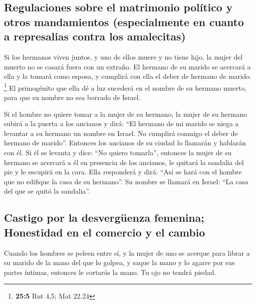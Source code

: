 \begin{paracol}{2}
\hypertarget{regulaciones-sobre-el-matrimonio-poluxedtico-y-otros-mandamientos-especialmente-en-cuanto-a-represalias-contra-los-amalecitas}{%
\subsection{Regulaciones sobre el matrimonio político y otros
mandamientos (especialmente en cuanto a represalias contra los
amalecitas)}\label{regulaciones-sobre-el-matrimonio-poluxedtico-y-otros-mandamientos-especialmente-en-cuanto-a-represalias-contra-los-amalecitas}}

 Si los hermanos viven juntos, y uno de ellos muere y no
tiene hijo, la mujer del muerto no se casará fuera con un extraño. El
hermano de su marido se acercará a ella y la tomará como esposa, y
cumplirá con ella el deber de hermano de marido. \footnote{\textbf{25:5}
  Rut 4,5; Mat 22,24}  El primogénito que ella dé a luz
sucederá en el nombre de su hermano muerto, para que su nombre no sea
borrado de Israel.

 Si el hombre no quiere tomar a la mujer de su hermano, la
mujer de su hermano subirá a la puerta a los ancianos y dirá: ``El
hermano de mi marido se niega a levantar a su hermano un nombre en
Israel. No cumplirá conmigo el deber de hermano de marido''.
 Entonces los ancianos de su ciudad lo llamarán y hablarán
con él. Si él se levanta y dice: ``No quiero tomarla'', 
entonces la mujer de su hermano se acercará a él en presencia de los
ancianos, le quitará la sandalia del pie y le escupirá en la cara. Ella
responderá y dirá: ``Así se hará con el hombre que no edifique la casa
de su hermano''.  Su nombre se llamará en Israel: ``La
casa del que se quitó la sandalia''.

\hypertarget{castigo-por-la-desverguxfcenza-femenina-honestidad-en-el-comercio-y-el-cambio}{%
\subsection{Castigo por la desvergüenza femenina; Honestidad en el
comercio y el
cambio}\label{castigo-por-la-desverguxfcenza-femenina-honestidad-en-el-comercio-y-el-cambio}}

 Cuando los hombres se peleen entre sí, y la mujer de uno
se acerque para librar a su marido de la mano del que lo golpea, y saque
la mano y lo agarre por sus partes íntimas,  entonces le
cortarás la mano. Tu ojo no tendrá piedad.


\end{paracol}
